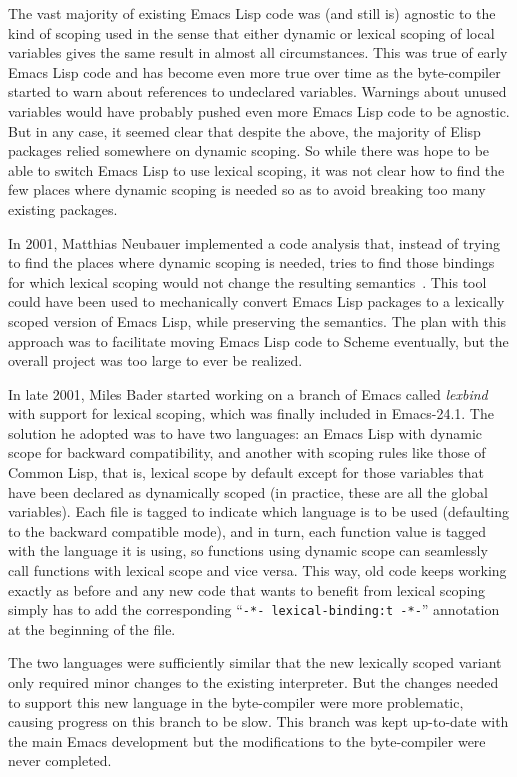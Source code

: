 \documentclass[format=acmsmall, review]{acmart}
\newcommand \Elisp {Emacs Lisp}
\begin{document}
The vast majority of existing \Elisp{} code was (and still is) agnostic to
the kind of scoping used in the sense that either dynamic or lexical scoping
of local variables gives the same result in almost all circumstances.  This was true of early
\Elisp{} code and has become even more true over time as the byte-compiler
started to warn about references to undeclared variables.  Warnings about
unused variables would have probably pushed even more \Elisp{} code to be
agnostic.  But in any case, it seemed clear that despite the above, the
majority of Elisp packages relied somewhere on dynamic scoping.  So while
there was hope to be able to switch \Elisp{} to use lexical scoping, it was
not clear how to find the few places where dynamic scoping is needed so as
to avoid breaking too many existing packages.

In 2001, Matthias Neubauer implemented a code
analysis that, instead of trying to find the places where dynamic scoping is
needed, tries to find those bindings for which lexical scoping would not
change the resulting semantics~\cite{Neubauer01}.
This tool could have been used to
mechanically convert \Elisp{} packages to a lexically scoped version of
\Elisp{}, while preserving the semantics.  The plan with this approach
was to facilitate moving \Elisp{} code to Scheme eventually, but the
overall project was too large to ever be realized.

In late 2001, Miles Bader started working on a branch of Emacs called
\emph{lexbind} with support for lexical scoping, which was finally included
in Emacs-24.1.  The solution he adopted was to have two languages: an
\Elisp{} with dynamic scope for backward compatibility, and another with
scoping rules like those of Common Lisp, that is, lexical scope by default
except for those variables that have been declared as dynamically scoped (in
practice, these are all the global variables).  Each file is tagged to
indicate which language is to be used (defaulting to the backward compatible
mode), and in turn, each function value is tagged with the language it is
using, so functions using dynamic scope can seamlessly call functions with
lexical scope and vice versa.  This way, old code keeps working exactly
as before and any new code that wants to benefit from lexical scoping
simply has to add the corresponding ``\texttt{-*- lexical-binding:t -*-}''
annotation at the beginning of the file.

The two languages were sufficiently similar that the new lexically scoped
variant only required minor changes to the existing interpreter.  But the
changes needed to support this new language in the byte-compiler were more
problematic, causing progress on this branch to be slow.  This branch was
kept up-to-date with the main Emacs development but the modifications to the
byte-compiler were never completed.
\end{document}
